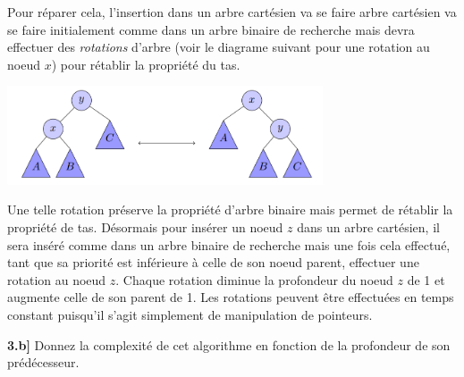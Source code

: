 \documentclass[a4paper,12pt]{report}
\begin{document}

\newpage

Pour réparer cela, l'insertion dans un arbre cartésien va se faire arbre cartésien va se faire initialement comme dans un arbre binaire de recherche mais devra effectuer des \textit{rotations} d'arbre (voir le diagrame suivant pour une rotation au noeud \( x \)) pour rétablir la propriété du tas.\\
\begin{center}
    \includegraphics[width=0.7\textwidth]{../images/rotationExplication.png}\\[-0.5cm]
\end{center}

Une telle rotation préserve la propriété d'arbre binaire mais permet de rétablir la propriété de tas. Désormais pour insérer un noeud \( z \) dans un arbre cartésien, il sera inséré comme dans un arbre binaire de recherche mais une fois cela effectué, tant que sa priorité est inférieure à celle de son noeud parent, effectuer une rotation au noeud \( z \). Chaque rotation diminue la profondeur du noeud \( z \) de 1 et augmente celle de son parent de 1. Les rotations peuvent être effectuées en temps constant puisqu'il s'agit simplement de manipulation de pointeurs.

\vspace{2cm}


\textbf{3.b]} Donnez la complexité de cet algorithme en fonction de la profondeur de son prédécesseur.
\end{document}
